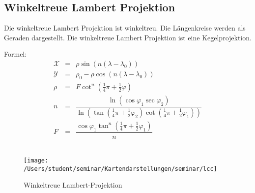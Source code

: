 \subsection{Winkeltreue Lambert Projektion}
\label{sec:lamwink}
Die winkeltreue Lambert Projektion ist winkeltreu. Die Längenkreise werden als Geraden dargestellt.
Die winkeltreue Lambert Projektion ist eine Kegelprojektion. 

Formel:\\
 \begin{eqnarray*}
 \mathcal{X}& = &\rho \sin ( n(\lambda -\lambda _0) )\\
 \mathcal{Y}& = &\rho _0-\rho \cos (n(\lambda - \lambda _0))\\
 \rho & = &F\cot ^n(\frac{1}{4}\pi + \frac{1}{2}\varphi)\\
 n& = &\dfrac{\ln (\cos \varphi _1 \sec \varphi _2)}{\ln (\tan (\frac{1}{4}\pi +\frac{1}{2}\varphi _2)\cot (\frac{1}{4}\pi + \frac{1}{2}\varphi _1))}\\
 F& = &\dfrac{\cos \varphi _1 \tan ^n(\frac{1}{4}\pi +\frac{1}{2}\varphi _1)}{n}
 \end{eqnarray*}\\
 
\begin{figure}[hbtp]
\centering
 \texttt{[image: /Users/student/seminar/Kartendarstellungen/seminar/lcc]} \caption{Winkeltreue Lambert-Projektion}
\end{figure}
\newpage 